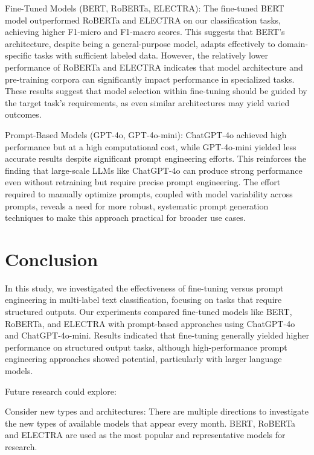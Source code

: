 \documentclass[11pt]{article}
\begin{document}
Fine-Tuned Models (BERT, RoBERTa, ELECTRA): The fine-tuned BERT model outperformed RoBERTa and ELECTRA on our classification tasks, achieving higher F1-micro and F1-macro scores. This suggests that BERT’s architecture, despite being a general-purpose model, adapts effectively to domain-specific tasks with sufficient labeled data. However, the relatively lower performance of RoBERTa and ELECTRA indicates that model architecture and pre-training corpora can significantly impact performance in specialized tasks. These results suggest that model selection within fine-tuning should be guided by the target task’s requirements, as even similar architectures may yield varied outcomes.

Prompt-Based Models (GPT-4o, GPT-4o-mini): ChatGPT-4o achieved high performance but at a high computational cost, while GPT-4o-mini yielded less accurate results despite significant prompt engineering efforts. This reinforces the finding that large-scale LLMs like ChatGPT-4o can produce strong performance even without retraining but require precise prompt engineering. The effort required to manually optimize prompts, coupled with model variability across prompts, reveals a need for more robust, systematic prompt generation techniques to make this approach practical for broader use cases.

\section{Conclusion} 


In this study, we investigated the effectiveness of fine-tuning versus prompt engineering in multi-label text classification, focusing on tasks that require structured outputs. Our experiments compared fine-tuned models like BERT, RoBERTa, and ELECTRA with prompt-based approaches using ChatGPT-4o and ChatGPT-4o-mini. Results indicated that fine-tuning generally yielded higher performance on structured output tasks, although high-performance prompt engineering approaches showed potential, particularly with larger language models.

Future research could explore:

Consider new types and architectures: There are multiple directions to investigate the new types of available models that appear every month. BERT, RoBERTa and ELECTRA are used as the most popular and representative models for research.
\end{document}
